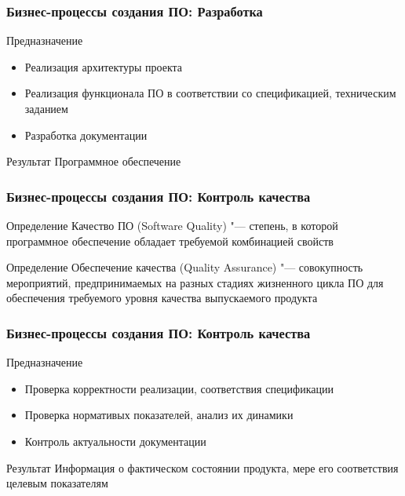 \documentclass{../industrial-development}
\begin{document}
\begin{frame} \frametitle{Бизнес-процессы создания ПО: Разработка}
	\begin{block}{Предназначение}
		\begin{itemize}
			\item Реализация архитектуры проекта
			\item Реализация функционала ПО в соответствии со спецификацией, техническим заданием
			\item Разработка документации
		\end{itemize}
	\end{block}
	\begin{block}{Результат}
		Программное обеспечение
	\end{block}
\end{frame}
\lecturenotes


\begin{frame} \frametitle{Бизнес-процессы создания ПО: Контроль качества}
	\begin{block}{Определение}
		\alert{Качество ПО} (Software Quality) "--- степень, в которой программное обеспечение обладает требуемой комбинацией свойств
	\end{block}
	\begin{block}{Определение}
		\alert{Обеспечение качества} (Quality Assurance) "--- совокупность мероприятий, предпринимаемых на разных стадиях жизненного цикла ПО для обеспечения требуемого уровня качества выпускаемого продукта
	\end{block}
\end{frame}
\lecturenotes


\begin{frame} \frametitle{Бизнес-процессы создания ПО: Контроль качества}
	\begin{block}{Предназначение}
		\begin{itemize}
			\item Проверка корректности реализации, соответствия спецификации
			\item Проверка нормативых показателей, анализ их динамики
			\item Контроль актуальности документации
		\end{itemize}
	\end{block}
	\begin{block}{Результат}
		Информация о фактическом состоянии продукта, мере его соответствия целевым показателям
	\end{block}
\end{frame}
\lecturenotes
\end{document}
